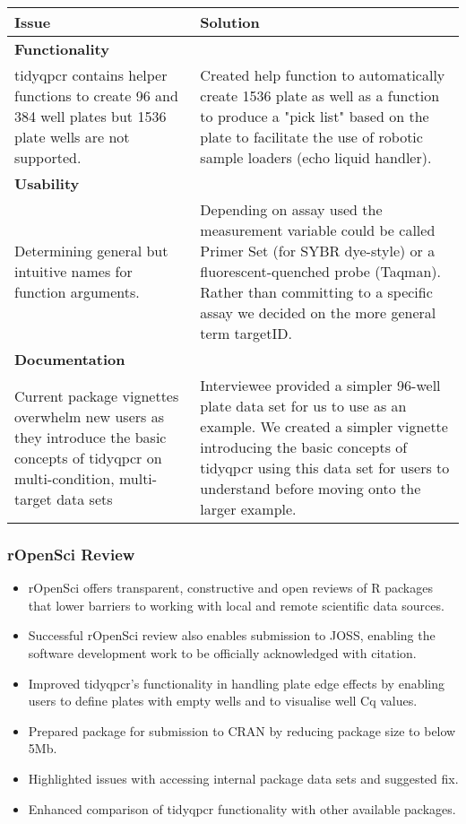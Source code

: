 \documentclass{SBCbookchapter}
\begin{document}
\begin{center}
\begin{tabular}{|| m{5.5cm} | m{8cm} ||} 
 \hline
 \textbf{\large Issue} & \textbf{\large Solution} \\ [0.5ex] 
 \hline\hline
 \multicolumn{2}{|l|}{\textbf{Functionality}} \\
 \hline
 tidyqpcr contains helper functions to create 96 and 384 well plates but 1536 plate wells are not supported. & Created help function to automatically create 1536 plate as well as a function to produce a "pick list" based on the plate to facilitate the use of robotic sample loaders (echo liquid handler). \\ 
 \hline
 \multicolumn{2}{|l|}{\textbf{Usability}} \\
 \hline
 Determining general but intuitive names for function arguments. & Depending on assay used the measurement variable could be called Primer Set (for SYBR dye-style) or a fluorescent-quenched probe (Taqman). Rather than committing to a specific assay we decided on the more general term targetID. \\
 \hline
 \multicolumn{2}{|l|}{\textbf{Documentation}} \\
 \hline
 Current package vignettes overwhelm new users as they introduce the basic concepts of tidyqpcr on multi-condition, multi-target data sets & Interviewee provided a simpler 96-well plate data set for us to use as an example. We created a simpler vignette introducing the basic concepts of tidyqpcr using this data set for users to understand before moving onto the larger example. \\
 \hline
\end{tabular}
\end{center}

\subsubsection{rOpenSci Review}

\begin{itemize}
    \item rOpenSci offers transparent, constructive and open reviews of R packages that lower barriers to working with local and remote scientific data sources.
    \item Successful rOpenSci review also enables submission to JOSS, enabling the software development work to be officially acknowledged with citation.
    \item Improved tidyqpcr's functionality in handling plate edge effects by enabling users to define plates with empty wells and to visualise well Cq values.
    \item Prepared package for submission to CRAN by reducing package size to below 5Mb.
    \item Highlighted issues with accessing internal package data sets and suggested fix.
    \item Enhanced comparison of tidyqpcr functionality with other available packages.
\end{itemize}




\end{document}
